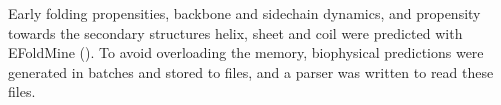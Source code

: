 Early folding propensities, backbone and sidechain dynamics, and propensity towards the secondary structures helix, sheet and coil were predicted with EFoldMine (\cite{raimondi2017}).
To avoid overloading the memory,
biophysical predictions were generated in batches and stored to files,
and a parser was written to read these files.
